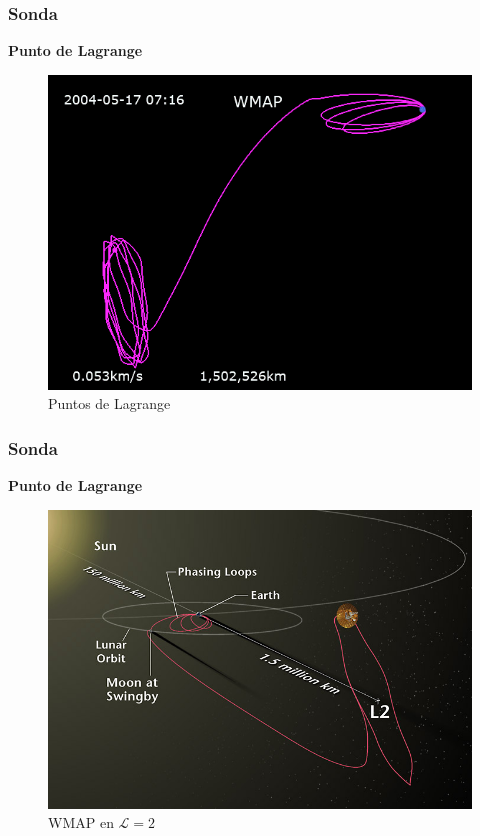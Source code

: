 \documentclass[UKenglish]{beamer}
\begin{document}
{\begin{frame}
\frametitle{Sonda}{\textbf{Punto de Lagrange}}
\begin{figure}[h!]
    \centering
    \includegraphics[scale=0.4]{real.png}
    \caption{Puntos de Lagrange}
    \label{fig:pun2tos}
    \end{figure}
\end{frame}
\begin{frame}
\frametitle{Sonda}{\textbf{Punto de Lagrange}}
\begin{figure}[h!]
    \centering
    \includegraphics[scale=0.3]{trac.jpg}
    \caption{WMAP en $\mathcal{L}=2$}
    \label{fig:pu3ntos}
    \end{figure}
\end{frame}

}
\end{document}
